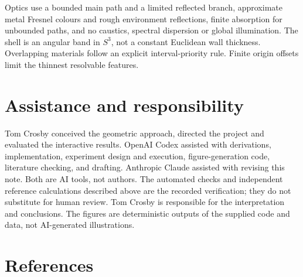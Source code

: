 \documentclass[11pt,a4paper]{article}
\begin{document}
Optics use a bounded main path and a limited reflected branch,
approximate metal Fresnel colours and rough environment reflections,
finite absorption for unbounded paths, and no caustics, spectral
dispersion or global illumination. The shell is an angular band in
\(S^3\), not a constant Euclidean wall thickness. Overlapping materials
follow an explicit interval-priority rule. Finite origin offsets limit
the thinnest resolvable features.

\section*{Assistance and
responsibility}\label{assistance-and-responsibility}

Tom Crosby conceived the geometric approach, directed the project and
evaluated the interactive results. OpenAI Codex assisted with
derivations, implementation, experiment design and execution,
figure-generation code, literature checking, and drafting. Anthropic
Claude assisted with revising this note. Both are AI tools, not authors.
The automated checks and independent reference calculations described
above are the recorded verification; they do not substitute for human
review. Tom Crosby is responsible for the interpretation and
conclusions. The figures are deterministic outputs of the supplied code
and data, not AI-generated illustrations.

\section*{References}\label{references}
\end{document}
